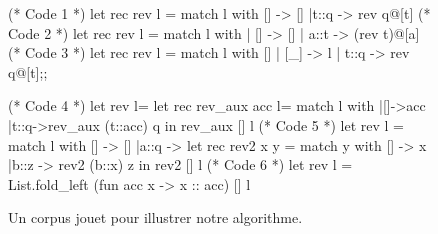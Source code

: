 \begin{figure}
\begin{multicols}{2}
\begin{ocaml}
(* Code 1 *)
let rec rev l = match l with
    [] -> []
  |t::q -> rev q@[t]
(* Code 2 *)
let rec rev l =
  match l with
  | [] -> []
  | a::t -> (rev t)@[a]
(* Code 3 *)
let rec rev l = match l with
    [] | [_] -> l
  | t::q -> rev q@[t];;
\end{ocaml}
\begin{ocaml}
(* Code 4 *)
let rev l=
  let rec rev_aux acc l=
    match l with
    |[]->acc
    |t::q->rev_aux (t::acc) q
  in rev_aux [] l
(* Code 5 *)
let rev l =
  match l with
    [] -> []
  |a::q -> let rec rev2 x y = match y with
        [] -> x
      |b::z -> rev2 (b::x) z in rev2 [] l
(* Code 6 *)
let rev l =
  List.fold_left (fun acc x -> x :: acc) [] l
\end{ocaml}
\end{multicols}
\label{fig:example:sources}
\caption{Un corpus jouet pour illustrer notre algorithme.}
\end{figure}
